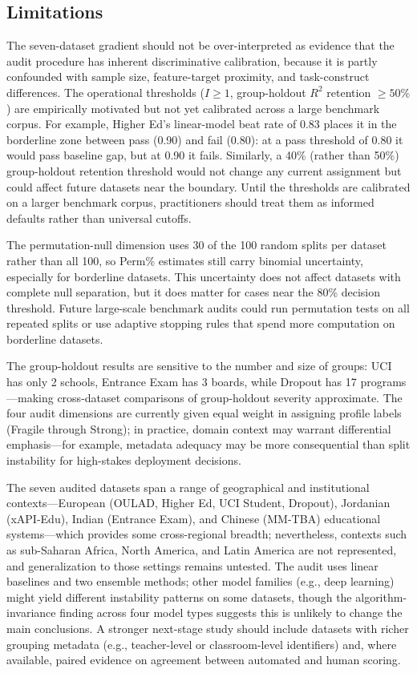 \documentclass[10pt,letterpaper]{wlscirep}
\begin{document}
\subsection{Limitations}

The seven-dataset gradient should not be over-interpreted as evidence that the audit procedure has inherent discriminative calibration, because it is partly confounded with sample size, feature-target proximity, and task-construct differences. The operational thresholds ($I \geq 1$, group-holdout $R^2$ retention $\geq 50\%$) are empirically motivated but not yet calibrated across a large benchmark corpus. For example, Higher Ed's linear-model beat rate of 0.83 places it in the borderline zone between pass (0.90) and fail (0.80): at a pass threshold of 0.80 it would pass baseline gap, but at 0.90 it fails. Similarly, a 40\% (rather than 50\%) group-holdout retention threshold would not change any current assignment but could affect future datasets near the boundary. Until the thresholds are calibrated on a larger benchmark corpus, practitioners should treat them as informed defaults rather than universal cutoffs.

The permutation-null dimension uses 30 of the 100 random splits per dataset rather than all 100, so Perm\% estimates still carry binomial uncertainty, especially for borderline datasets. This uncertainty does not affect datasets with complete null separation, but it does matter for cases near the 80\% decision threshold. Future large-scale benchmark audits could run permutation tests on all repeated splits or use adaptive stopping rules that spend more computation on borderline datasets.

The group-holdout results are sensitive to the number and size of groups: UCI has only 2 schools, Entrance Exam has 3 boards, while Dropout has 17 programs---making cross-dataset comparisons of group-holdout severity approximate. The four audit dimensions are currently given equal weight in assigning profile labels (Fragile through Strong); in practice, domain context may warrant differential emphasis---for example, metadata adequacy may be more consequential than split instability for high-stakes deployment decisions.

The seven audited datasets span a range of geographical and institutional contexts---European (OULAD, Higher Ed, UCI Student, Dropout), Jordanian (xAPI-Edu), Indian (Entrance Exam), and Chinese (MM-TBA) educational systems---which provides some cross-regional breadth; nevertheless, contexts such as sub-Saharan Africa, North America, and Latin America are not represented, and generalization to those settings remains untested. The audit uses linear baselines and two ensemble methods; other model families (e.g., deep learning) might yield different instability patterns on some datasets, though the algorithm-invariance finding across four model types suggests this is unlikely to change the main conclusions. A stronger next-stage study should include datasets with richer grouping metadata (e.g., teacher-level or classroom-level identifiers) and, where available, paired evidence on agreement between automated and human scoring.
\end{document}
